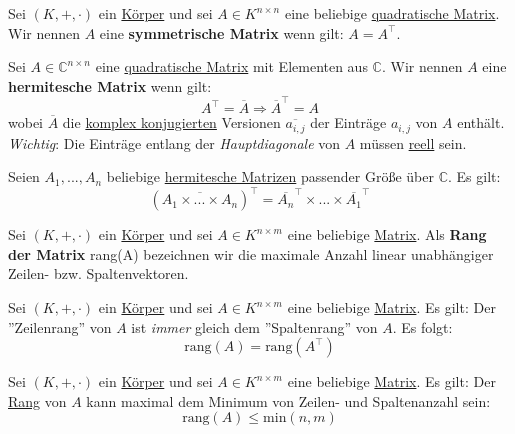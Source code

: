 \documentclass[../../main.tex]{subfiles}
\begin{document}
	
	\begin{definition}
		\label{def:SymmetrischeMatrix}
		Sei $(K,+,\cdot)$ ein \hyperref[def:Körper]{Körper} und sei $A\in K^{n \times n}$ eine beliebige \hyperref[def:QuadratischeMatrix]{quadratische Matrix}. Wir nennen $A$ eine \textbf{symmetrische Matrix} wenn gilt: $A=A^\top$. 
	\end{definition}

	\begin{definition}
		\label{def:HermitescheMatrix}
		Sei $A \in \mathbb{C}^{n \times n}$ eine \hyperref[def:QuadratischeMatrix]{quadratische Matrix} mit Elementen aus $\mathbb{C}$. Wir nennen $A$ eine \textbf{hermitesche Matrix} wenn gilt: $$A^\top = \overline{A} \Rightarrow \overline{A}^\top = A$$ wobei $\overline{A}$ die \hyperref[def:komplexKonjugiert]{komplex konjugierten} Versionen $\overline{a_{i,j}}$ der Einträge $a_{i,j}$ von $A$ enthält. \textit{Wichtig}: Die Einträge entlang der \textit{Hauptdiagonale} von $A$ müssen \hyperref[def:ReelleZahlen]{reell} sein. 
	\end{definition}

	\begin{theorem}
		Seien $A_1,...,A_n$ beliebige \hyperref[def:HermitescheMatrix]{hermitesche Matrizen} passender Größe über $\mathbb{C}$. Es gilt: $$(\overline{A_1 \times ... \times A_n})^\top = \overline{A_n}^\top \times ... \times \overline{A_1}^\top$$
	\end{theorem}

	\begin{definition}
		\label{def:RangMatrix}
		Sei $(K,+,\cdot)$ ein \hyperref[def:Körper]{Körper} und sei $A\in K^{n \times m}$ eine beliebige \hyperref[def:Matrix]{Matrix}. Als \textbf{Rang der Matrix} \textrm{rang}(A) bezeichnen wir die maximale Anzahl linear unabhängiger Zeilen- bzw. Spaltenvektoren.
	\end{definition}

	\begin{theorem}
		Sei $(K,+,\cdot)$ ein \hyperref[def:Körper]{Körper} und sei $A\in K^{n \times m}$ eine beliebige \hyperref[def:Matrix]{Matrix}. Es gilt: Der ''Zeilenrang'' von $A$ ist \textit{immer} gleich dem ''Spaltenrang'' von $A$. Es folgt: $$\textrm{rang}(A) = \textrm{rang}(A^\top)$$
	\end{theorem}

	\begin{theorem}
		Sei $(K,+,\cdot)$ ein \hyperref[def:Körper]{Körper} und sei $A\in K^{n \times m}$ eine beliebige \hyperref[def:Matrix]{Matrix}. Es gilt: Der \hyperref[def:RangMatrix]{Rang} von $A$ kann maximal dem Minimum von Zeilen- und Spaltenanzahl sein: $$\textrm{rang}(A) \leq \textrm{min}(n,m)$$
	\end{theorem}
\end{document}

